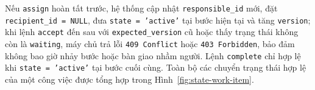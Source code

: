 Nếu \texttt{assign} hoàn tất trước, hệ thống cập nhật \texttt{responsible\_\hspace{0pt}id} mới, đặt \texttt{recipient\_\hspace{0pt}id = NULL}, đưa \texttt{state = 'active'} tại bước hiện tại và tăng \texttt{version}; khi lệnh \texttt{accept} đến sau với \texttt{expected\_\hspace{0pt}version} cũ hoặc thấy trạng thái không còn là \texttt{waiting}, máy chủ trả lỗi \texttt{409 Conflict} hoặc \texttt{403 Forbidden}, bảo đảm không bao giờ nhảy bước hoặc bàn giao nhầm người.
Lệnh \texttt{complete} chỉ hợp lệ khi \texttt{state = 'active'} tại bước cuối cùng.
Toàn bộ các chuyển trạng thái hợp lệ của một công việc được tổng hợp trong Hình~\ref{fig:state-work-item}.



